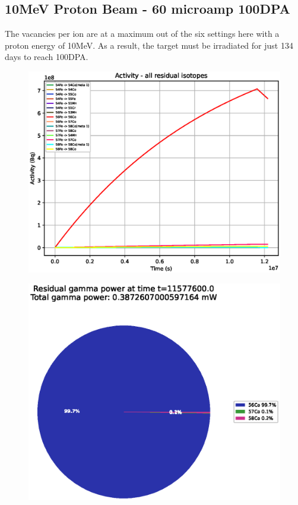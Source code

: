 \clearpage
\FloatBarrier
\subsection{10MeV Proton Beam - 60 microamp 100DPA}

The vacancies per ion are at a maximum out of the six settings here with a proton energy of 10MeV.  As a result, the target must be irradiated for just 134 days to reach 100DPA.

\begin{figure}[!htb]
\centering
\includegraphics[width=0.7\linewidth]{chapters/results_activity_code/fe_100dpa/by_isotope/10MeV_all_radioactive_isotopes.eps}
\caption{}
\label{fig:5mev-proton-100dpa-activity}
\end{figure}

\begin{figure}[!htb]
\centering
\includegraphics[width=0.7\linewidth]{chapters/results_activity_code/fe_100dpa/endofbeam/10MeV_0400_11577600.eps}
\caption{}
\label{fig:5mev-proton-100dpa}
\end{figure}


